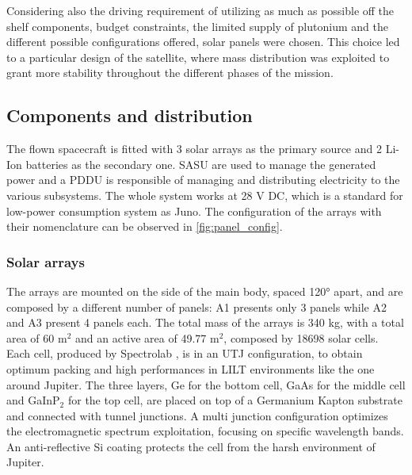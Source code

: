 Considering also the driving requirement of utilizing as much as possible off the shelf components, budget constraints, the limited supply of plutonium and the different possible configurations offered, solar panels were chosen. This choice led to a particular design of the satellite, where mass distribution was exploited to grant more stability throughout the different phases of the mission.  

\subsection{Components and distribution}
\label{subsec:components_and_distribution}

The flown spacecraft is fitted with 3 solar arrays as the primary source and 2 Li-Ion batteries as the secondary one. SASU are used to manage the generated power and a PDDU is responsible of managing and distributing electricity to the various subsystems.
The whole system works at 28 V DC, which is a standard for low-power consumption system as Juno. The configuration of the arrays with their nomenclature can be observed in \autoref{fig:panel_config}.

\subsubsection{Solar arrays}
\label{susubsec:solar_arrays}

The arrays are mounted on the side of the main body, spaced 120° apart, and are composed by a different number of panels: A1 presents only 3 panels while A2 and A3 present 4 panels each. The total mass of the arrays is 340 kg, with a total area of 60 m$^2$ \cite{arrays_mass} and an active area of 49.77 m$^2$, composed by 18698 solar cells.\cite{masses_ref} 
Each cell, produced by Spectrolab \cite{solar_datasheet}, is in an UTJ configuration, to obtain optimum packing and high performances in LILT environments like the one around Jupiter. The three layers, Ge for the bottom cell, GaAs for the middle cell and GaInP$_2$ for the top cell, are placed on top of a Germanium Kapton substrate and connected with tunnel junctions. A multi junction configuration optimizes the electromagnetic spectrum exploitation, focusing on specific wavelength bands. An anti-reflective Si coating protects the cell from the harsh environment of Jupiter. 

